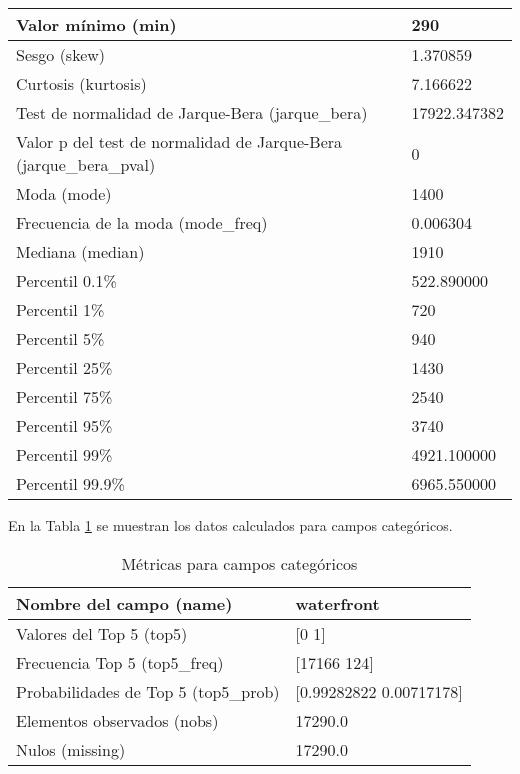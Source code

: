 \begin{longtable}{|m{10em}|m{25em}|}
    Valor mínimo (min) & 290 \\ \hline
    Sesgo (skew) & 1.370859 \\ \hline
    Curtosis (kurtosis) & 7.166622 \\ \hline
    Test de normalidad de Jarque-Bera (jarque\_bera) & 17922.347382 \\ \hline
    Valor p del test de normalidad de Jarque-Bera (jarque\_bera\_pval) & 0 \\ \hline
    Moda (mode) & 1400 \\ \hline
    Frecuencia de la moda (mode\_freq) & 0.006304 \\ \hline
    Mediana (median) & 1910 \\ \hline
    Percentil 0.1\% & 522.890000 \\ \hline
    Percentil 1\% & 720 \\ \hline
    Percentil 5\% & 940 \\ \hline
    Percentil 25\% & 1430 \\ \hline
    Percentil 75\% & 2540 \\ \hline
    Percentil 95\% & 3740 \\ \hline
    Percentil 99\% & 4921.100000 \\ \hline
    Percentil 99.9\% & 6965.550000 \\ \hline
\end{longtable}

En la Tabla \ref{metricas-categoricas} se muestran los datos calculados para campos categóricos.

\begin{table}[H]
    \centering
    \caption{Métricas para campos categóricos}
    \label{metricas-categoricas}
    \begin{tabular}{|m{10em}|m{25em}|}
        \hline
        \rowcolor[gray]{0.8}
        Nombre del campo (name) & waterfront \\ \hline
        Valores del Top 5 (top5) & [0 1] \\ \hline
        Frecuencia Top 5 (top5\_freq) & [17166   124] \\ \hline
        Probabilidades de Top 5 (top5\_prob) & [0.99282822 0.00717178] \\ \hline
        Elementos observados (nobs) & 17290.0 \\ \hline
        Nulos (missing) & 17290.0 \\ \hline
    \end{tabular}
\end{table}


